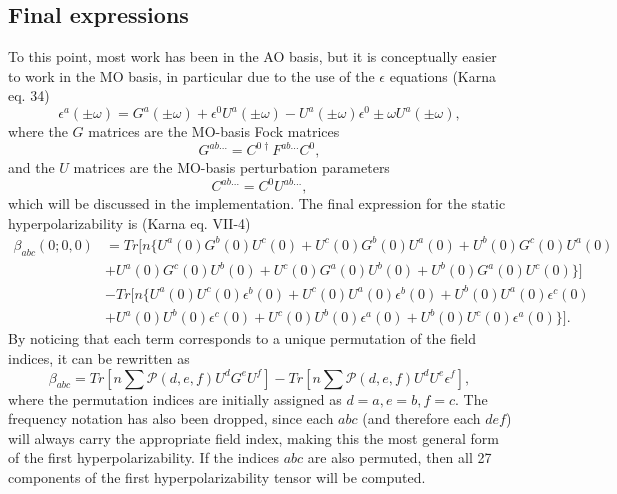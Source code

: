 \hypertarget{final-expressions}{%
  \subsection{Final expressions}\label{final-expressions}}

To this point, most work has been in the AO basis, but it is conceptually easier to work in the MO basis, in particular due to the use of the \(\epsilon\) equations (Karna eq. 34)
\begin{equation}
  \epsilon^{a}(\pm\omega) = G^{a}(\pm\omega) + \epsilon^{0} U^{a}(\pm\omega) - U^{a}(\pm\omega) \epsilon^{0} \pm \omega U^{a}(\pm\omega),
\end{equation}
where the \(G\) matrices are the MO-basis Fock matrices
\begin{equation}
  G^{ab\dots} = C^{0\dagger} F^{ab\dots} C^{0},
\end{equation}
and the \(U\) matrices are the MO-basis perturbation parameters
\begin{equation}
  C^{ab\dots} = C^{0} U^{ab\dots},
\end{equation}
which will be discussed in the implementation. The final expression for the static hyperpolarizability is (Karna eq. VII-4)
\begin{equation}
  \begin{split}
    \beta_{abc}(0; 0, 0) &= Tr[n \{U^{a}(0) G^{b}(0) U^{c}(0) + U^{c}(0) G^{b}(0) U^{a}(0) + U^{b}(0) G^{c}(0) U^{a}(0) \\
    &+ U^{a}(0) G^{c}(0) U^{b}(0) + U^{c}(0) G^{a}(0) U^{b}(0) + U^{b}(0) G^{a}(0) U^{c}(0)\} ] \\
    &- Tr[n \{ U^{a}(0) U^{c}(0) \epsilon^{b}(0) + U^{c}(0) U^{a}(0) \epsilon^{b}(0) + U^{b}(0) U^{a}(0) \epsilon^{c}(0) \\
    &+ U^{a}(0) U^{b}(0) \epsilon^{c}(0) + U^{c}(0) U^{b}(0) \epsilon^{a}(0) + U^{b}(0) U^{c}(0) \epsilon^{a}(0) \} ].
  \end{split}
\end{equation}
By noticing that each term corresponds to a unique permutation of the field indices, it can be rewritten as
\begin{equation}
  \beta_{abc} = Tr\left[ n \sum \mathcal{P}(d,e,f) U^{d} G^{e} U^{f} \right] - Tr\left[ n \sum \mathcal{P}(d,e,f) U^{d} U^{e} \epsilon^{f} \right],
\end{equation}
where the permutation indices are initially assigned as \(d = a, e = b, f = c\). The frequency notation has also been dropped, since each \(abc\) (and therefore each \(def\)) will always carry the appropriate field index, making this the most general form of the first hyperpolarizability. If the indices \(abc\) are also permuted, then all 27 components of the first hyperpolarizability tensor will be computed.

